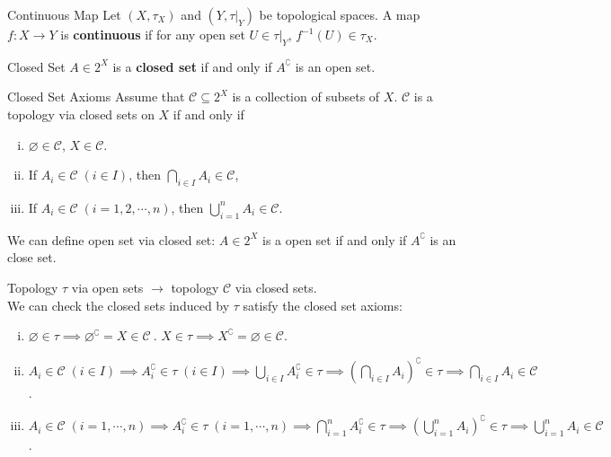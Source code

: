 \documentclass{report}
\begin{document}
\begin{definition}{Continuous Map}{}
	Let $(X,\tau_X)$ and $(Y,\tau |_Y)$ be topological spaces. A map $f:X\to Y$ is \textbf{continuous} if for any open set $U\in\tau |_Y$, $f^{-1}(U)\in\tau_X$.
\end{definition}



\begin{definition}{Closed Set}{}
	$A\in 2^X$ is a \textbf{closed set} if and only if $A^{\complement}$ is an open set.
\end{definition}

\begin{definition}{Closed Set Axioms}{}
	Assume that $\mathcal{C}\subseteq2^X $ is a collection of subsets of $X$. $\mathcal{C}$ is a topology via closed sets on $X$ if and only if
	\begin{enumerate}[(i)]
		\item $\varnothing\in \mathcal{C}$, $X\in \mathcal{C}$.
		\item If $A_i\in\mathcal{C}\;(i\in I)$, then $\bigcap\limits_{i\in I}A_i\in \mathcal{C}$,
		\item If $A_i\in\mathcal{C}\;(i=1,2,\cdots,n)$, then $\bigcup\limits_{i=1}^nA_i\in \mathcal{C}$.
	\end{enumerate}
	We can define open set via closed set: $A\in 2^X$ is a open set if and only if $A^{\complement}$ is an close set.
\end{definition}


\begin{prf}
	Topology $\tau$ via open sets $\rightarrow$ topology $\mathcal{C}$ via closed sets.\\
	We can check the closed sets induced by $\tau$ satisfy the closed set axioms:
	\begin{enumerate}[(i)]
		\item $\varnothing\in \tau\implies\varnothing^{\complement}=X\in \mathcal{C} \ $. $X\in \tau\implies X^{\complement}=\varnothing\in \mathcal{C}$.
		\item $A_i\in\mathcal{C}\;(i\in I)\implies A_i^{\complement}\in\tau\;(i\in I)\implies\bigcup\limits_{i\in I}A_i^{\complement}\in \tau\implies \left(\bigcap\limits_{i\in I}A_i\right)^{\complement}\in \tau\implies\bigcap\limits_{i\in I}A_i\in\mathcal{C}$.
		\item $A_i\in\mathcal{C}\;(i=1,\cdots,n)\implies A_i^{\complement}\in\tau\;(i=1,\cdots,n)\implies\bigcap\limits_{i=1}^nA_i^{\complement}\in \tau\implies \left(\bigcup\limits_{i=1}^nA_i\right)^{\complement}\in \tau\implies\bigcup\limits_{i=1}^nA_i\in\mathcal{C}$.
	\end{enumerate}
\end{prf}
\end{document}
